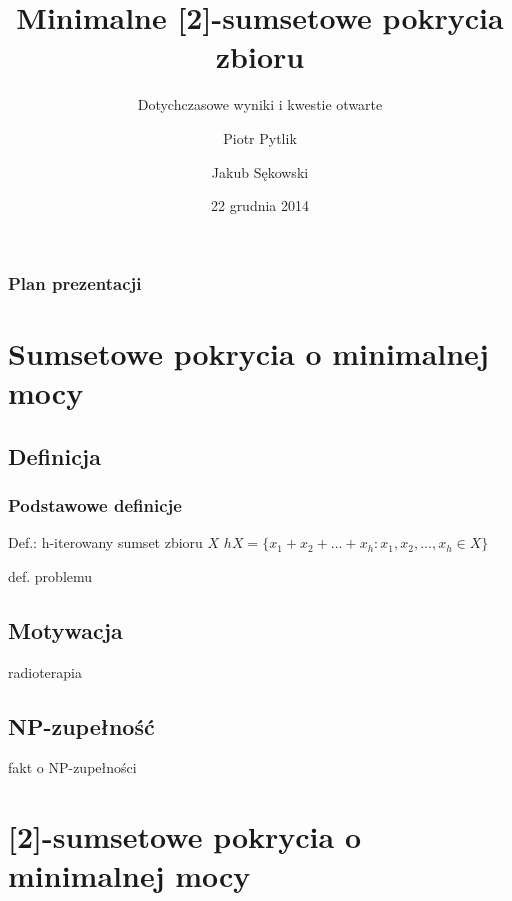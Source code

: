 \documentclass{beamer}
\begin{document}
\title{Minimalne [2]-sumsetowe pokrycia zbioru}
\subtitle{Dotychczasowe wyniki i kwestie otwarte}
\author[Piotr Pytlik \& Jakub Sękowski]{Piotr Pytlik \and Jakub Sękowski}
\date{22 grudnia 2014}

\begin{frame}
	\titlepage
\end{frame}

\begin{frame}
	\frametitle{Plan prezentacji}
	\tableofcontents
\end{frame}

\section{Sumsetowe pokrycia o minimalnej mocy}
	\subsection{Definicja}
		\begin{frame} \frametitle{Podstawowe definicje}
            Def.: h-iterowany sumset zbioru $ X $
            $ hX = \lbrace x_1 + x_2 + ... + x_h : x_1,x_2,...,x_h \in X \rbrace $
            
            \vspace{\baselineskip}
            
			def. problemu
		\end{frame}
		
	\subsection{Motywacja}
		\begin{frame}
			radioterapia
		\end{frame}	
			
	\subsection{NP-zupełność}
		\begin{frame}
			fakt o NP-zupełności
		\end{frame}
		
\section{[2]-sumsetowe pokrycia o minimalnej mocy}
\end{document}

